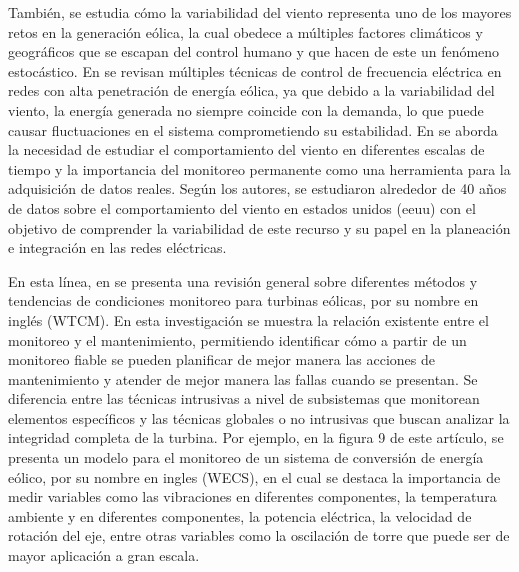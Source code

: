 \documentclass[letterpaper,12pt, oneside]{book}
\begin{document}
También, se estudia cómo la variabilidad del viento representa uno de los mayores retos en la generación eólica, la cual obedece a múltiples factores climáticos y geográficos que se escapan del control humano y que hacen de este un fenómeno estocástico. En \cite{ref30} se revisan múltiples técnicas de control de frecuencia eléctrica en redes con alta penetración de energía eólica, ya que debido a la variabilidad del viento, la energía generada no siempre coincide con la demanda, lo que puede causar fluctuaciones en el sistema comprometiendo su estabilidad. En \cite{ref31} se aborda la necesidad de estudiar el comportamiento del viento en diferentes escalas de tiempo y la importancia del monitoreo permanente como una herramienta para la adquisición de datos reales. Según los autores, se estudiaron alrededor de 40 años de datos sobre el comportamiento del viento en estados unidos (eeuu) con el objetivo de comprender la variabilidad de este recurso y su papel en la planeación e integración en las redes eléctricas.

En esta línea, en \cite{ref32} se presenta una revisión general sobre diferentes métodos y tendencias de condiciones monitoreo para turbinas eólicas, por su nombre en inglés (WTCM). En esta investigación se muestra la relación existente entre el monitoreo y el mantenimiento, permitiendo identificar cómo a partir de un monitoreo fiable se pueden planificar de mejor manera las acciones de mantenimiento y atender de mejor manera las fallas cuando se presentan. Se diferencia entre las técnicas intrusivas a nivel de subsistemas que monitorean elementos específicos y las técnicas globales o no intrusivas que buscan analizar la integridad completa de la turbina. Por ejemplo, en la figura 9 de este artículo, se presenta un modelo para el monitoreo de un sistema de conversión de energía eólico, por su nombre en ingles (WECS), en el cual se destaca la importancia de medir variables como las vibraciones en diferentes componentes, la temperatura ambiente y en diferentes componentes, la potencia eléctrica, la velocidad de rotación del eje, entre otras variables como la oscilación de torre que puede ser de mayor aplicación a gran escala. 
\end{document}
